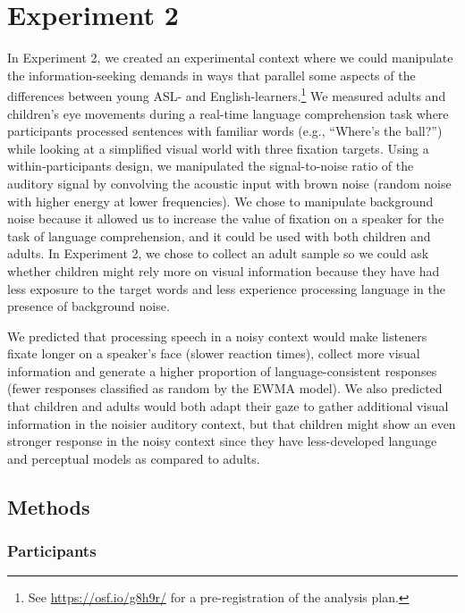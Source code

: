 \documentclass[,man,floatsintext]{apa6}
\let\rmarkdownfootnote\footnote%
\def\footnote{\protect\rmarkdownfootnote}
\begin{document}
\hypertarget{experiment-2}{%
\section{Experiment 2}\label{experiment-2}}

In Experiment 2, we created an experimental context where we could manipulate the information-seeking demands in ways that parallel some aspects of the differences between young ASL- and English-learners.\footnote{See \url{https://osf.io/g8h9r/} for a pre-registration of the analysis plan.} We measured adults and children's eye movements during a real-time language comprehension task where participants processed sentences with familiar words (e.g., \enquote{Where's the ball?}) while looking at a simplified visual world with three fixation targets. Using a within-participants design, we manipulated the signal-to-noise ratio of the auditory signal by convolving the acoustic input with brown noise (random noise with higher energy at lower frequencies). We chose to manipulate background noise because it allowed us to increase the value of fixation on a speaker for the task of language comprehension, and it could be used with both children and adults. In Experiment 2, we chose to collect an adult sample so we could ask whether children might rely more on visual information because they have had less exposure to the target words and less experience processing language in the presence of background noise.

We predicted that processing speech in a noisy context would make listeners fixate longer on a speaker's face (slower reaction times), collect more visual information and generate a higher proportion of language-consistent responses (fewer responses classified as random by the EWMA model). We also predicted that children and adults would both adapt their gaze to gather additional visual information in the noisier auditory context, but that children might show an even stronger response in the noisy context since they have less-developed language and perceptual models as compared to adults.

\hypertarget{methods-1}{%
\subsection{Methods}\label{methods-1}}

\hypertarget{participants-1}{%
\subsubsection{Participants}\label{participants-1}}
\end{document}

